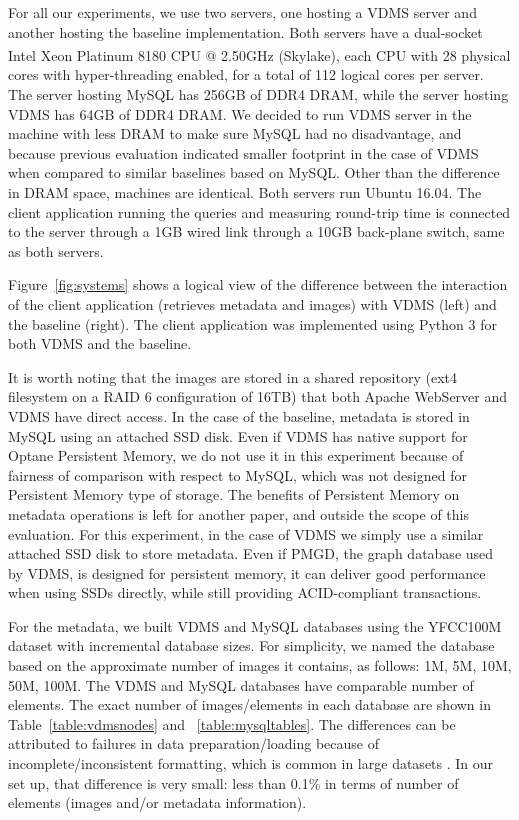 For all our experiments, we use two servers, one hosting a VDMS server and
another hosting the baseline implementation.
Both servers have a dual-socket Intel\textsuperscript{\textregistered}
Xeon\textsuperscript{\textregistered} Platinum 8180 CPU @ 2.50GHz (Skylake),
each CPU with 28 physical cores with hyper-threading enabled,
for a total of 112 logical cores per server.
The server hosting MySQL has 256GB of DDR4 DRAM, while the server hosting VDMS
has 64GB of DDR4 DRAM.
We decided to run VDMS server in the machine with less DRAM to make
sure MySQL had no disadvantage, and because previous evaluation
indicated smaller footprint in the case of VDMS when
compared to similar baselines based on MySQL.
Other than the difference in DRAM space, machines are identical.
Both servers run Ubuntu 16.04.
The client application running the queries and measuring round-trip time
is connected to the server through a 1GB wired link through
a 10GB back-plane switch, same as both servers.

Figure~\ref{fig:systems} shows a logical view of the difference between the
interaction of the client application (retrieves metadata and
images) with VDMS (left) and the baseline (right).
The client application was implemented using Python 3 for both VDMS and
the baseline.

It is worth noting that the images are stored in a shared repository
(ext4 filesystem on a RAID 6 configuration of 16TB) that both 
Apache WebServer and VDMS have direct access. 
In the case of the baseline, metadata is
stored in MySQL using an attached SSD disk.
Even if VDMS has native support for Optane Persistent Memory,
we do not use it in this experiment because of fairness of
comparison with respect to MySQL, which was not designed for
Persistent Memory type of storage.
The benefits of Persistent Memory on metadata operations is left
for another paper, and outside the scope of this evaluation.
For this experiment, in the case of VDMS we simply use a similar
attached SSD disk to store metadata.
Even if PMGD, the graph database used by VDMS, is designed for persistent memory,
it can deliver good performance when using SSDs directly, while still
providing ACID-compliant  transactions.

For the metadata, we built VDMS and MySQL databases
using the YFCC100M dataset with incremental database sizes.
For simplicity, we named the database based on the approximate number of images
it contains, as follows: 1M, 5M, 10M, 50M, 100M.
The VDMS and MySQL databases have comparable number of elements. 
The exact number of images/elements in each database are shown in
Table~\ref{table:vdmsnodes} and ~\ref{table:mysqltables}.
The differences can be attributed to failures in data 
preparation/loading because of incomplete/inconsistent formatting, 
which is common in large datasets \cite{failures}.
In our set up, that difference is very small: 
less than 0.1\% in terms of number of elements (images and/or metadata information).

